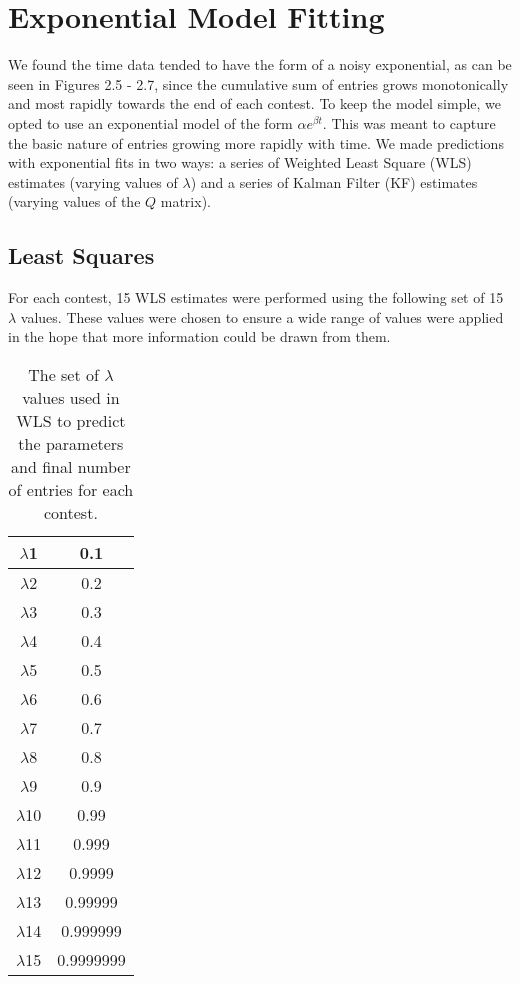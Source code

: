 \section{Exponential Model Fitting}

We found the time data tended to have the form of a noisy exponential, as can be seen in Figures 2.5 - 2.7, since the cumulative sum of entries grows monotonically and most rapidly towards the end of each contest. To keep the model simple, we opted to use an exponential model of the form $\alpha e^{\beta t}$. This was meant to capture the basic nature of entries growing more rapidly with time. We made predictions with exponential fits in two ways: a series of Weighted Least Square (WLS) estimates (varying values of $\lambda$) and a series of Kalman Filter (KF) estimates (varying values of the $Q$ matrix).

\subsection{Least Squares}
For each contest, 15 WLS estimates were performed using the following set of 15 $\lambda$ values. These values were chosen to ensure a wide range of values were applied in the hope that more information could be drawn from them.

\begin{table}
\begin{center}
\begin{tabular}{| c | c |}
\hline
 $\lambda$1 & 0.1 \\  
 \hline
 $\lambda$2 & 0.2 \\  
 \hline
 $\lambda$3 & 0.3 \\  
 \hline
 $\lambda$4 & 0.4 \\  
 \hline
 $\lambda$5 & 0.5 \\  
 \hline
 $\lambda$6 & 0.6 \\  
 \hline
 $\lambda$7 & 0.7 \\  
 \hline
 $\lambda$8 & 0.8 \\  
 \hline
 $\lambda$9 & 0.9 \\  
 \hline
 $\lambda$10 & 0.99 \\  
 \hline
 $\lambda$11 & 0.999 \\  
 \hline
 $\lambda$12 & 0.9999 \\  
 \hline
 $\lambda$13 & 0.99999 \\  
 \hline
 $\lambda$14 & 0.999999 \\  
 \hline
 $\lambda$15 & 0.9999999 \\  
 \hline
\end{tabular}
\caption[Least Squares Parameters Utilized]{The set of $\lambda$ values used in WLS to predict the parameters and final number of entries for each contest.}
\end{center}
\end{table}

